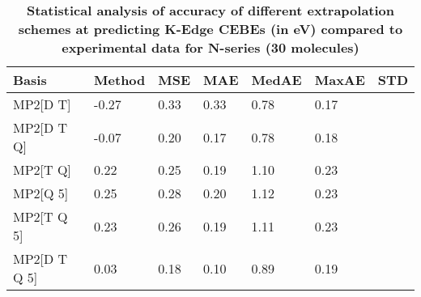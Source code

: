 \begin{table}
  \caption{\textbf{Statistical analysis of accuracy of different extrapolation schemes at predicting K-Edge CEBEs (in eV) compared to experimental data for N-series (30 molecules)}}
  \begin{tabular}{l l l l l l l }
    \toprule
    \textbf{Basis} & \textbf{Method} & \textbf{MSE} & \textbf{MAE} & \textbf{MedAE} & \textbf{MaxAE} & \textbf{STD} \\ 
    \midrule
    MP2[D T] & -0.27 & 0.33 & 0.33 & 0.78 & 0.17 \\ 
    MP2[D T Q] & -0.07 & 0.20 & 0.17 & 0.78 & 0.18 \\ 
    MP2[T Q] & 0.22 & 0.25 & 0.19 & 1.10 & 0.23 \\ 
    MP2[Q 5] & 0.25 & 0.28 & 0.20 & 1.12 & 0.23 \\ 
    MP2[T Q 5] & 0.23 & 0.26 & 0.19 & 1.11 & 0.23 \\ 
    MP2[D T Q 5] & 0.03 & 0.18 & 0.10 & 0.89 & 0.19 \\ 
    \bottomrule
  \end{tabular}
\end{table}
